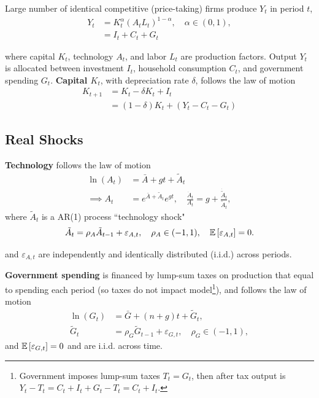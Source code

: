\documentclass[../main.tex]{subfiles}
\begin{document}
        
        Large number of identical competitive (price-taking) firms produce $Y_t$ in period $t$,
        \begin{align}
            Y_t &= K_t^\alpha \left( A_t L_t\right)^{1-\alpha}, \quad \alpha \in (0, 1),
            \\
            &= I_t + C_t + G_t
        \end{align}
        
        where capital $K_t$, technology $A_t$, and labor $L_t$ are production factors. Output $Y_t$ is allocated between investment $I_t$, household consumption $C_t$, and government spending $G_t$. \textbf{Capital $K_t$}, with depreciation rate $\delta$, follows the law of motion
        \begin{align}
            K_{t+1} &= K_t - \delta K_{t} + I_t \\
            &= (1 - \delta) K_{t} + (Y_t - C_t - G_t)
        \end{align}
        
    \subsection{Real Shocks}
        
        \textbf{Technology} follows the law of motion
        \begin{align}
            \ln(A_t) &= \bar{A} + gt + \tilde{A}_t
            \\
            \implies
            A_t
            &= e^{\bar{A} + \tilde{A}_t}e^{gt},
            \quad \frac{\dot{A}_t}{A_t}
            = g + \frac{\dot{\tilde{A}}_t}{\tilde{A}_t},
        \end{align}
        where $\tilde{A}_t$ is a AR(1) process ``technology shock"
        \begin{align}
            \tilde{A}_{t} = \rho_A \tilde{A}_{t-1} + \varepsilon_{A, t},
            \quad \rho_A \in (-1, 1),
            \quad \mathbb{E}\left[\varepsilon_{A, t}\right] = 0.
        \end{align}
        
        and $\varepsilon_{A, t}$ are independently and identically distributed (i.i.d.) across periods.
        
        \vspace{0.5cm}
        
        \textbf{Government spending} is financed by lump-sum taxes on production that equal to spending each period (so taxes do not impact model\footnote{Government imposes lump-sum taxes $T_t = G_t$, then after tax output is $Y_t - T_t = C_t + I_t + G_t - T_t = C_t + I_t$.}), and follows the law of motion
        \begin{align}
            \ln(G_t) &= \bar{G} + (n + g)t + \tilde{G}_t,
            \\
            \tilde{G}_t &= \rho_G \tilde{G}_{t - 1} + \varepsilon_{G, t},
            \quad \rho_G \in (-1, 1),
        \end{align}
        and $\mathbb{E}\left[\varepsilon_{G, t}\right] = 0$ and are i.i.d. across time.
        
\end{document}

